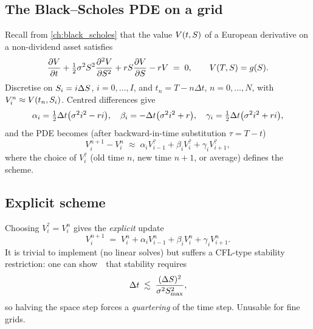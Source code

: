 \subsection{The Black--Scholes PDE on a grid}

Recall from \cref{ch:black_scholes} that the value $V(t, S)$ of a
European derivative on a non-dividend asset satisfies
\begin{equation}
\label{eq:bs_pde_ch34}
  \frac{\partial V}{\partial t}
  + \tfrac12 \sigma^2 S^2 \frac{\partial^2 V}{\partial S^2}
  + r S \frac{\partial V}{\partial S}
  - r V \;=\; 0,
  \qquad V(T, S) = g(S).
\end{equation}
Discretise on $S_i = i\Delta S$, $i = 0,\ldots,I$, and $t_n =
T - n\Delta t$, $n = 0,\ldots,N$, with $V_i^n \approx V(t_n, S_i)$.
Centred differences give
\begin{equation}
\label{eq:fd_coeffs}
  \alpha_i = \tfrac12 \Delta t \bigl(\sigma^2 i^2 - r i\bigr), \quad
  \beta_i  = -\Delta t \bigl(\sigma^2 i^2 + r\bigr), \quad
  \gamma_i = \tfrac12 \Delta t \bigl(\sigma^2 i^2 + r i\bigr),
\end{equation}
and the PDE becomes (after backward-in-time substitution
$\tau = T - t$)
\begin{equation}
  V_i^{n+1} - V_i^n \;\approx\;
    \alpha_i V_{i-1}^{?} + \beta_i V_i^{?} + \gamma_i V_{i+1}^{?},
\end{equation}
where the choice of $V_i^{?}$ (old time $n$, new time $n+1$, or
average) defines the scheme.

\subsection{Explicit scheme}

Choosing $V_i^{?} = V_i^n$ gives the \emph{explicit} update
\begin{equation}
  V_i^{n+1} \;=\; V_i^n + \alpha_i V_{i-1}^n
                + \beta_i V_i^n + \gamma_i V_{i+1}^n.
\end{equation}
It is trivial to implement (no linear solves) but suffers a CFL-type
stability restriction: one can show~\citeHull\ that stability requires
\begin{equation}
\label{eq:explicit_stab}
  \Delta t \;\lesssim\; \frac{(\Delta S)^2}{\sigma^2 S_{\max}^2},
\end{equation}
so halving the space step forces a \emph{quartering} of the time
step.  Unusable for fine grids.

